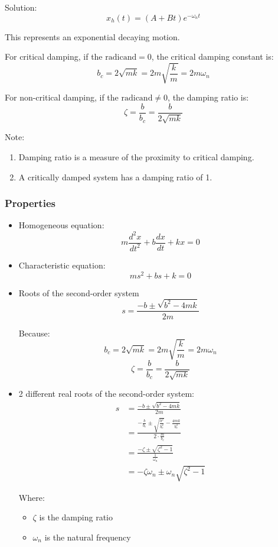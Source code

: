 \documentclass[11pt]{article}
\begin{document}
Solution:
\[x_h (t) = (A + Bt) e^{- \omega_n t}\]

This represents an exponential decaying motion.

For critical damping, if the \(\text{radicand} = 0\), the critical damping constant is:
\[b_c = 2 \sqrt{mk} = 2m \sqrt{\frac{k}{m}} = 2 m \omega_n\]

For non-critical damping, if the \(\text{radicand} \ne 0\), the damping ratio is:
\[\zeta = \frac{b}{b_c} = \frac{b}{2 \sqrt{mk}}\]

Note:
\begin{enumerate}
\item Damping ratio is a measure of the proximity to critical damping.
\item A critically damped system has a damping ratio of 1.
\end{enumerate}
\subsubsection{Properties}
\label{sec:orge85865e}
\begin{itemize}
\item Homogeneous equation:
\[m \frac{d^2 x}{dt^2} + b \frac{dx}{dt} + kx = 0\]
\item Characteristic equation:
\[ms^2 + bs + k = 0\]
\item Roots of the second-order system
\[s = \frac{-b \pm \sqrt{b^2 - 4mk}}{2m}\]

Because:
\[b_c = 2 \sqrt{mk} = 2m \sqrt{\frac{k}{m}} = 2 m \omega_n\]
\[\zeta = \frac{b}{b_c} = \frac{b}{2 \sqrt{mk}}\]

\item 2 different real roots of the second-order system:
\begin{align*}
s &= \frac{-b \pm \sqrt{b^2 - 4mk}}{2m} \\
&= \frac{- \frac{b}{b_c} \pm \sqrt{\frac{b^2}{b_c^2}} - \frac{4mk}{b_c^2}}{2 \cdot \frac{m}{b_c}} \\
&= \frac{- \zeta \pm \sqrt{\zeta^2 - 1}}{\frac{1}{\omega_n}} \\
&= -\zeta \omega_n \pm \omega_n \sqrt{\zeta^2 - 1}
\end{align*}

Where:
\begin{itemize}
\item \(\zeta\) is the damping ratio
\item \(\omega_n\) is the natural frequency
\end{itemize}
\end{itemize}
\end{document}
